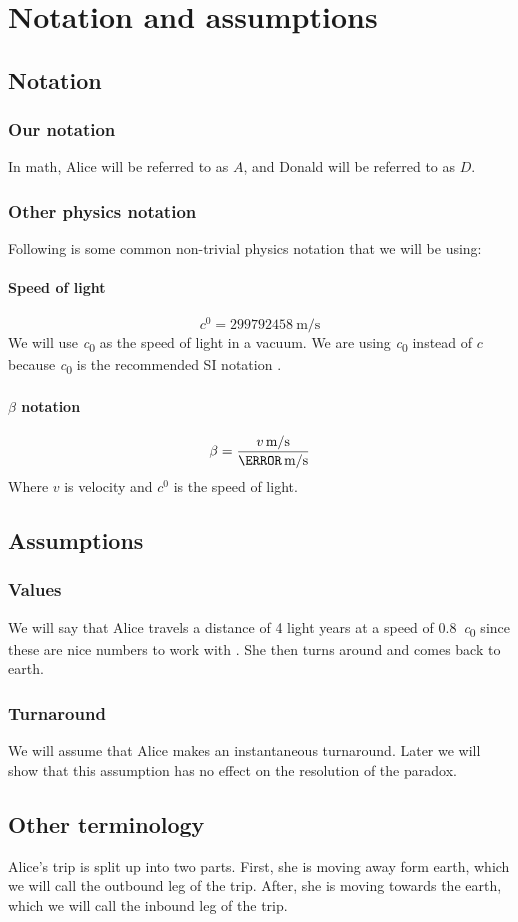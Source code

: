 	\section{Notation and assumptions}
		\subsection{Notation}
			\subsubsection{Our notation}
				In math, Alice will be referred to as $A$, and Donald will be referred to as $D$.
			\subsubsection{Other physics notation}
			Following is some common non-trivial physics notation that we will be using:
			\paragraph{Speed of light}
				\[\si{\clight} = \SI{299792458}{\metre/\second}\]
				We will use \si{\clight} as the speed of light in a vacuum. We are using \si{\clight} instead of $c$ because \si{\clight} is the recommended SI notation \autocite{siunits}.
			\paragraph{$\beta$ notation}
				\[\beta = \frac{\varSI{v}{\metre/\second}}{\varSI{\clight}{\metre/\second}}\]
				Where $v$ is velocity and $\si{\clight}$ is the speed of light.
		\subsection{Assumptions}\label{subsec:twinAssumptions}
			\subsubsection{Values}
				We will say that Alice travels a distance of 4 light years at a speed of \SI{0.8}{\clight} since these are nice numbers to work with \autocite[\pno~35]{kogut2012introduction}.
				She then turns around and comes back to earth.
			\subsubsection{Turnaround}
				We will assume that Alice makes an instantaneous turnaround.
				Later we will show that this assumption has no effect on the resolution of the paradox.
		\subsection{Other terminology}
			Alice's trip is split up into two parts.
			First, she is moving away form earth, which we will call the outbound leg of the trip.
			After, she is moving towards the earth, which we will call the inbound leg of the trip.
